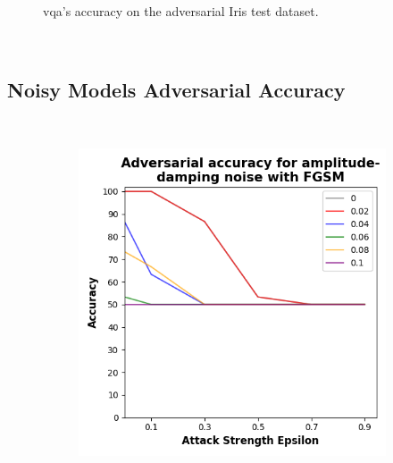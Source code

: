 \begin{figure}[!h]
\begin{subfigure}{0.45\textwidth}
      \label{fig:iris4}
  \end{subfigure}

  \caption{\ac{vqa}'s accuracy on the adversarial Iris test dataset.}
\end{figure} \

\subsection{Noisy Models Adversarial Accuracy}\label{subsection:iris-noisy-adv-acc} \


\begin{figure}[!h]
  \centering

  \begin{subfigure}{0.45\textwidth}
      \includegraphics[width=\linewidth]{figures/evaluation_results/iris/pqc/figures/amplitude-damping-fgsm.png}
      \label{fig:iris5}
  \end{subfigure} \qquad
  \begin{subfigure}{0.45\textwidth}

\end{subfigure}
\end{figure}
